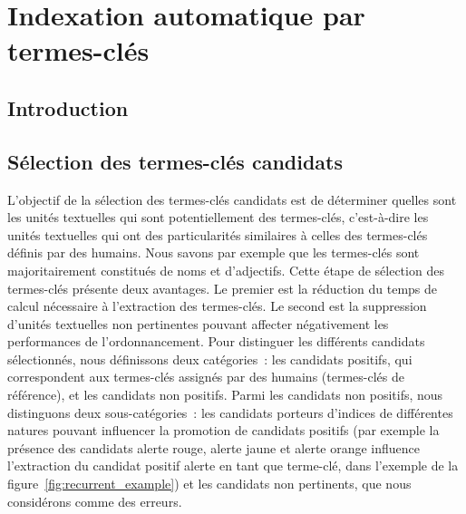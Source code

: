 \chapter{Indexation automatique par termes-clés}
\label{part:main-state_of_the_art}
  \section{Introduction}
  \label{sec:main-state_of_the_art-introduction}


  \section{Sélection des termes-clés candidats}
  \label{sec:main-state_of_the_art-keyphrase_candidate_selection}
    L'objectif de la sélection des termes-clés candidats est de déterminer
    quelles sont les unités textuelles qui sont potentiellement des
    termes-clés, c'est-à-dire les unités textuelles qui ont des particularités
    similaires à celles des termes-clés définis par des humains. Nous savons
    par exemple que les termes-clés sont majoritairement constitués de noms et
    d'adjectifs. Cette étape de sélection des termes-clés présente deux
    avantages. Le premier est la réduction du temps de calcul nécessaire à
    l'extraction des  termes-clés. Le second est la suppression d'unités
    textuelles non pertinentes pouvant affecter négativement les performances
    de l'ordonnancement. Pour distinguer les différents candidats
    sélectionnés, nous définissons deux catégories~: les candidats positifs,
    qui correspondent aux termes-clés assignés par des humains (termes-clés de
    référence), et les candidats non positifs. Parmi les candidats non
    positifs, nous distinguons deux sous-catégories~: les candidats porteurs
    d'indices de différentes natures pouvant influencer la promotion de
    candidats positifs (par exemple la présence des candidats \og{}alerte
    rouge\fg{}, \og{}alerte jaune\fg{} et \og{}alerte orange\fg{} influence
    l'extraction du candidat positif \og{}alerte\fg{} en tant que terme-clé,
    dans l'exemple de la figure~\ref{fig:recurrent_example}) et les candidats
    non pertinents, que nous considérons comme des erreurs.

